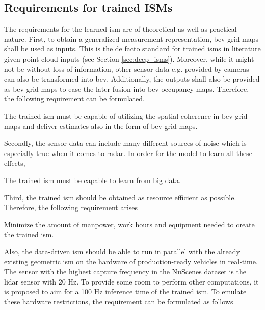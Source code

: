 \subsection{Requirements for trained ISMs}
\label{subsec:requirements_for_ev_representation}
The requirements for the learned \gls{ism} are of theoretical as well as practical nature. First, to obtain a generalized measurement representation, \gls{bev} grid maps shall be used as inputs. This is the de facto standard for trained \gls{ism}s in literature given point cloud inputs (see Section \ref{sec:deep_isms}). Moreover, while it might not be without loss of information, other sensor data e.g. provided by cameras can also be transformed into \gls{bev}. Additionally, the outputs shall also be provided as \gls{bev} grid maps to ease the later fusion into \gls{bev} occupancy maps. Therefore, the following requirement can be formulated.
\\
\setcounter{req}{1}
\setcounter{subreq}{0}
\begin{subreq} \label{subreq:input_output}
	The trained \gls{ism} must be capable of utilizing the spatial coherence in \gls{bev} grid maps and deliver estimates also in the form of \gls{bev} grid maps.
\end{subreq}
Secondly, the sensor data can include many different sources of noise which is especially true when it comes to radar. In order for the model to learn all these effects, 
\\
\begin{subreq} \label{subreq:big_data}
	The trained \gls{ism} must be capable to learn from big data.
\end{subreq}
Third, the trained \gls{ism} should be obtained as resource efficient as possible. Therefore, the following requirement arises
\\
\begin{subreq} \label{subreq:min_requirements}
	Minimize the amount of manpower, work hours and equipment needed to create the trained \gls{ism}.
\end{subreq}
Also, the data-driven \gls{ism} should be able to run in parallel with the already existing geometric \gls{ism} on the hardware of production-ready vehicles in real-time. The sensor with the highest capture frequency in the NuScenes dataset is the lidar sensor with 20 Hz. To provide some room to perform other computations, it is proposed to aim for a 100 Hz inference time of the trained \gls{ism}. To emulate these hardware restrictions, the requirement can be formulated as follows
